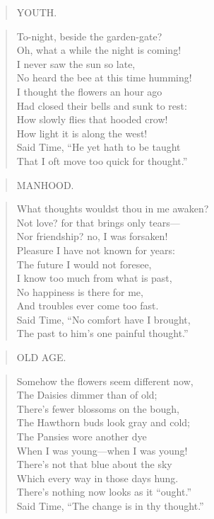 \documentclass[11pt,twoside]{article}
\begin{document}
\begin{verse}
YOUTH.
\end{verse}

\begin{verse}
To-night, beside the garden-gate?\\
\quad Oh, what a while the night is coming!\\
I never saw the sun so late,\\
\quad No heard the bee at this time humming!\\
I thought the flowers an hour ago\\
\quad Had closed their bells and sunk to rest:\\
How slowly flies that hooded crow!\\
\quad How light it is along the west!\\
Said Time, “He yet hath to be taught\\
That I oft move too quick for thought.”
\end{verse}

\begin{verse}
MANHOOD.
\end{verse}

\begin{verse}
What thoughts wouldst thou in me awaken?\\
\quad Not love? for that brings only tears---\\
Nor friendship? no, I was forsaken!\\
\quad Pleasure I have not known for years:\\
The future I would not foresee,\\
\quad I know too much from what is past,\\
No happiness is there for me,\\
\quad And troubles ever come too fast.\\
Said Time, “No comfort have I brought,\\
The past to him’s one painful thought.”
\end{verse}

\begin{verse}
OLD AGE.
\end{verse}

\begin{verse}
Somehow the flowers seem different now,\\
\quad The Daisies dimmer than of old;\\
There’s fewer blossoms on the bough,\\
\quad The Hawthorn buds look gray and cold;\\
The Pansies wore another dye\\
\quad When I was young---when I was young!\\
There’s not that blue about the sky\\
\quad Which every way in those days hung.\\
There’s nothing now looks as it “ought.”\\
Said Time, “The change is in thy thought.”
\end{verse}
\end{document}
